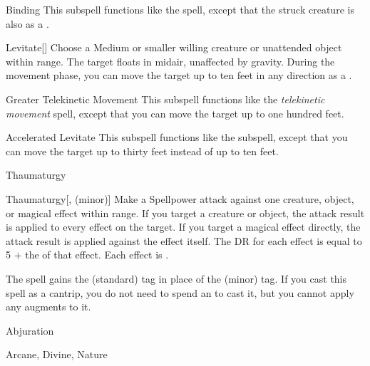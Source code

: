 \begin{ability}[\nth{3}]{Binding}
This subspell functions like the  spell, except that the struck creature is also \immobilized as a .
\end{ability}
\vspace{0.25em}


\begin{ability}[\nth{3}]{Levitate}[]
Choose a Medium or smaller willing creature or unattended object within \rngclose range.
The target floats in midair, unaffected by gravity.
During the movement phase, you can move the target up to ten feet in any direction as a .
\end{ability}
\vspace{0.25em}


\begin{ability}[\nth{4}]{Greater Telekinetic Movement}
This subspell functions like the \textit{telekinetic movement} spell, except that you can move the target up to one hundred feet.
\end{ability}
\vspace{0.25em}


\begin{ability}[\nth{5}]{Accelerated Levitate}
This subspell functions like the  subspell, except that you can move the target up to thirty feet instead of up to ten feet.
\end{ability}
\vspace{0.25em}

\newpage
\begin{spellsection}{Thaumaturgy}


\begin{ability}{Thaumaturgy}[,  (minor)]
Make a Spellpower attack against one creature, object, or magical effect within \rngmed range.
If you target a creature or object, the attack result is applied to every  effect on the target.
If you target a magical effect directly, the attack result is applied against the effect itself.
The DR for each effect is equal to 5 + the  of that effect.
\hit Each effect is .
\end{ability}



 The spell gains the  (standard) tag in place of the  (minor) tag. If you cast this spell as a cantrip,
you do not need to spend an  to cast it,
but you cannot apply any augments to it.


 Abjuration

 Arcane, Divine, Nature
\end{spellsection}


